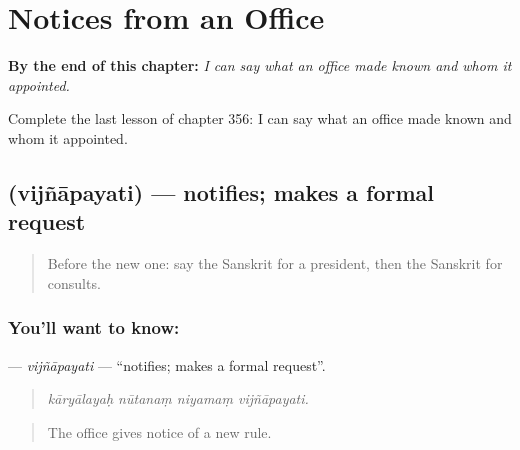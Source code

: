 
\chapter{Notices from an Office}
\label{ch:sa-notices-from-an-office}

\begin{chapteropening}
\textbf{By the end of this chapter:} \emph{I can say what an office made known and whom it appointed.}

Complete the last lesson of chapter 356: I can say what an office made known and whom it appointed.
\end{chapteropening}

\section[\texorpdfstring{\sk{विज्ञापयति} (vijñāpayati)}{विज्ञापयति (vijñāpayati)}]{ (vijñāpayati) — notifies; makes a formal request}

\label{lesson:SA-C356-vijnapayati}



\begin{quote}
Before the new one: say the Sanskrit for a president, then the Sanskrit for consults.
\end{quote}

\subsection*{You'll want to know: }
\textbf{} — \emph{vijñāpayati} — \textquotedblleft{}notifies; makes a formal request\textquotedblright{}.

\begin{quote}
   
\end{quote}

\begin{quote}
\emph{kāryālayaḥ nūtanaṃ niyamaṃ vijñāpayati.}
\end{quote}

\begin{quote}
The office gives notice of a new rule.
\end{quote}

